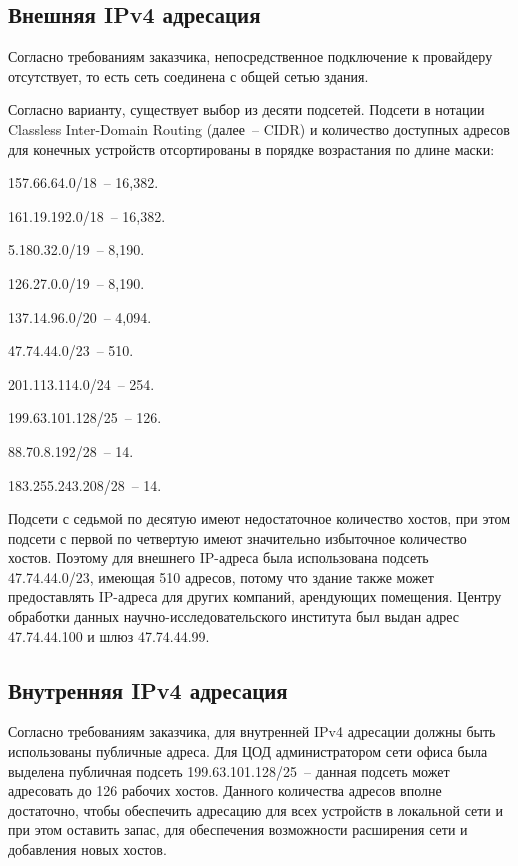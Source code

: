 \subsection{Внешняя IPv4 адресация}

Согласно требованиям заказчика, непосредственное подключение к провайдеру отсутствует, то есть сеть соединена с общей сетью здания. 

Согласно варианту, существует выбор из десяти подсетей. Подсети в нотации Classless Inter-Domain Routing (далее~-- CIDR) и количество доступных адресов для конечных устройств отсортированы в порядке возрастания по длине маски:

\begin{enumerate_num}
    \item 157.66.64.0/18~-- 16,382.
    \item 161.19.192.0/18~-- 16,382.
    \item 5.180.32.0/19~-- 8,190.
    \item 126.27.0.0/19~-- 8,190.
    \item 137.14.96.0/20~-- 4,094.
    \item 47.74.44.0/23~-- 510.
    \item 201.113.114.0/24~-- 254.
    \item 199.63.101.128/25~-- 126.
    \item 88.70.8.192/28~-- 14.
    \item 183.255.243.208/28~-- 14.
\end{enumerate_num}

Подсети с седьмой по десятую имеют недостаточное количество хостов, при этом подсети с первой по четвертую имеют значительно избыточное количество хостов. Поэтому для внешнего IP-адреса была использована подсеть 47.74.44.0/23, имеющая 510 адресов, потому что здание также может предоставлять IP-адреса для других компаний, арендующих помещения. Центру обработки данных научно-исследовательского института был выдан адрес 47.74.44.100 и шлюз 47.74.44.99.

\subsection{Внутренняя IPv4 адресация}

Согласно требованиям заказчика, для внутренней IPv4 адресации должны быть использованы публичные адреса. Для ЦОД администратором сети офиса была выделена публичная подсеть 199.63.101.128/25~-- данная подсеть может адресовать до 126 рабочих хостов. Данного количества адресов вполне достаточно, чтобы обеспечить адресацию для всех устройств в локальной сети и при этом оставить запас, для обеспечения возможности расширения сети и добавления новых хостов. 

